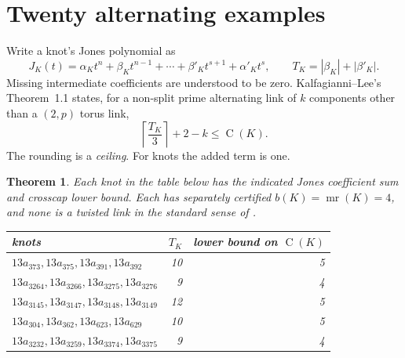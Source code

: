 \documentclass[11pt]{article}
\newtheorem{theorem}[proposition]{Theorem}
\newcommand{\C}{\operatorname{C}}
\begin{document}
\section{Twenty alternating examples}

Write a knot's Jones polynomial as
\[
 J_K(t)=\alpha_Kt^n+\beta_Kt^{n-1}
       +\cdots+\beta'_Kt^{s+1}+\alpha'_Kt^s,
 \qquad T_K=|\beta_K|+|\beta'_K|.
\]
Missing intermediate coefficients are understood to be zero.
Kalfagianni--Lee's Theorem~1.1 \cite{kl}
states, for a non-split prime alternating link of $k$ components
other than a $(2,p)$ torus link,
\[
                  \left\lceil\frac{T_K}{3}\right\rceil+2-k
                    \le \C(K).
\]
The rounding is a \emph{ceiling}. For knots the added term is one.

\begin{theorem}\label{thm:cases}
Each knot in the table below has the indicated Jones coefficient sum
and crosscap lower bound. Each has separately certified
$b(K)=\operatorname{mr}(K)=4$, and none is a twisted link in the
standard sense of \cite{bbk}.
\begin{center}
\small
\begin{tabular}{p{9.1cm}rr}
\toprule
knots & $T_K$ & lower bound on $\C(K)$\\
\midrule
$13a_{373},13a_{375},13a_{391},13a_{392}$ &10&5\\
$13a_{3264},13a_{3266},13a_{3275},13a_{3276}$ &9&4\\
$13a_{3145},13a_{3147},13a_{3148},13a_{3149}$ &12&5\\
$13a_{304},13a_{362},13a_{623},13a_{629}$ &10&5\\
$13a_{3232},13a_{3259},13a_{3374},13a_{3375}$ &9&4\\
\bottomrule
\end{tabular}
\end{center}
\end{theorem}
\end{document}
